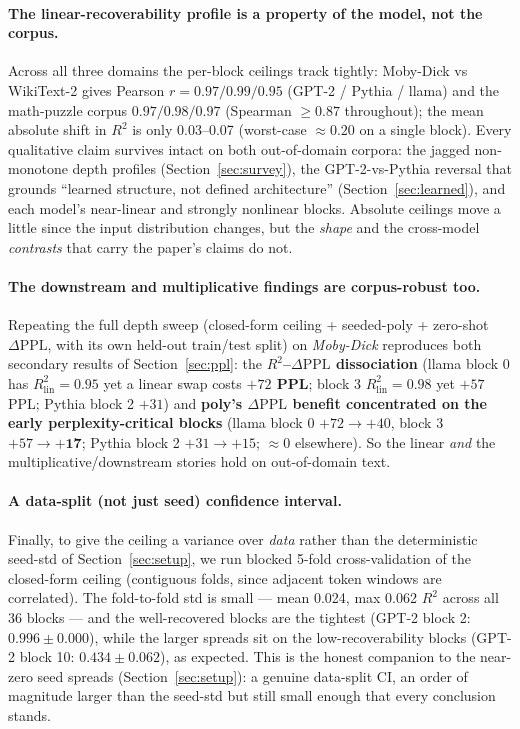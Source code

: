 \documentclass{article}
\newcommand{\Rlin}{R^2_{\mathrm{lin}}}
\newcommand{\dppl}{\Delta\mathrm{PPL}}
\begin{document}
\paragraph{The linear-recoverability profile is a property of the model, not the corpus.} Across
all three domains the per-block ceilings track tightly: Moby-Dick vs WikiText-2 gives Pearson
$r = 0.97 / 0.99 / 0.95$ (GPT-2 / Pythia / llama) and the math-puzzle corpus $0.97 / 0.98 / 0.97$
(Spearman $\ge 0.87$ throughout); the mean absolute shift in $R^2$ is only 0.03--0.07 (worst-case
$\approx 0.20$ on a single block). Every qualitative claim survives intact on both out-of-domain
corpora: the jagged non-monotone depth profiles (Section~\ref{sec:survey}), the GPT-2-vs-Pythia
reversal that grounds ``learned structure, not defined architecture'' (Section~\ref{sec:learned}), and each model's
near-linear and strongly nonlinear blocks. Absolute ceilings move a little since
the input distribution changes, but the \emph{shape} and the cross-model \emph{contrasts} that
carry the paper's claims do not.

\paragraph{The downstream and multiplicative findings are corpus-robust too.} Repeating the full
depth sweep (closed-form ceiling + seeded-poly + zero-shot $\dppl$, with its own held-out
train/test split) on \emph{Moby-Dick} reproduces both secondary results of Section~\ref{sec:ppl}:
the \textbf{$R^2$--$\dppl$ dissociation} (llama block 0 has $\Rlin = 0.95$ yet a linear swap costs
\textbf{$+72$ PPL}; block 3 $\Rlin = 0.98$ yet $+57$ PPL; Pythia block 2 $+31$) and \textbf{poly's
$\dppl$ benefit concentrated on the early perplexity-critical blocks} (llama block 0 $+72\to+40$,
block 3 $+57\to\mathbf{+17}$; Pythia block 2 $+31\to+15$; $\approx 0$ elsewhere). So the linear
\emph{and} the multiplicative/downstream stories hold on out-of-domain text.

\paragraph{A data-split (not just seed) confidence interval.} Finally, to give the ceiling a
variance over \emph{data} rather than the deterministic seed-std of Section~\ref{sec:setup}, we run
blocked 5-fold cross-validation of the closed-form ceiling (contiguous folds, since adjacent token
windows are correlated). The fold-to-fold std is small --- mean 0.024, max 0.062 $R^2$ across all
36 blocks --- and the well-recovered blocks are the tightest (GPT-2 block 2: $0.996 \pm 0.000$),
while the larger spreads sit on the low-recoverability blocks (GPT-2 block 10: $0.434 \pm 0.062$),
as expected. This is the honest companion to the near-zero seed spreads (Section~\ref{sec:setup}):
a genuine data-split CI, an order of magnitude larger than the seed-std but still small enough that
every conclusion stands.
\end{document}
